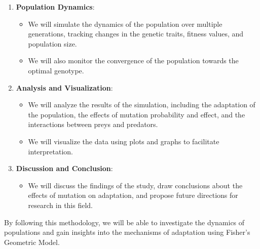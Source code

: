\documentclass{article}
\begin{document}
\begin{enumerate}
    \item \textbf{Population Dynamics}:
    \begin{itemize}
        \item We will simulate the dynamics of the population over multiple generations, tracking changes in the genetic traits, fitness values, and population size.
        \item We will also monitor the convergence of the population towards the optimal genotype.
    \end{itemize}
    
    \item \textbf{Analysis and Visualization}:
    \begin{itemize}
        \item We will analyze the results of the simulation, including the adaptation of the population, the effects of mutation probability and effect, and the interactions between preys and predators.
        \item We will visualize the data using plots and graphs to facilitate interpretation.
    \end{itemize}
    
    \item \textbf{Discussion and Conclusion}:
    \begin{itemize}
        \item We will discuss the findings of the study, draw conclusions about the effects of mutation on adaptation, and propose future directions for research in this field.
    \end{itemize}
\end{enumerate}

By following this methodology, we will be able to investigate the dynamics of populations and gain insights into the mechanisms of adaptation using Fisher's Geometric Model.
\end{document}
